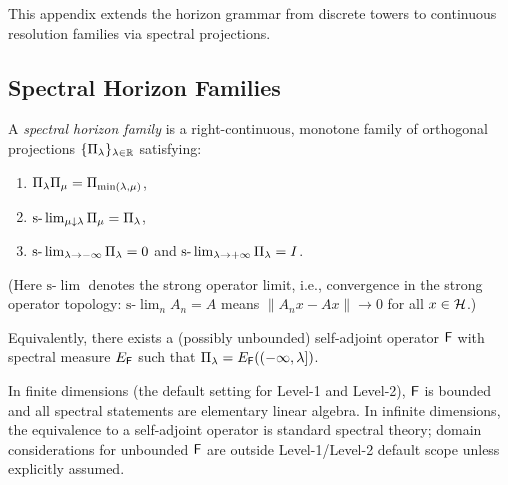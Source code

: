 \label{sec:continuous-spectral-horizons}

This appendix extends the horizon grammar from discrete towers to continuous
resolution families via spectral projections.

\subsection{Spectral Horizon Families}
\label{subsec:spectral-horizon-families}

\begin{definition}
\label{def:spectral-horizon-family}
A \emph{spectral horizon family} is a right-continuous, monotone family of orthogonal projections $\{\Pi_{\lambda}\}_{\lambda\in\mathbb{R}}$ satisfying:
\begin{enumerate}[label=(\roman*)]
\item $\Pi_{\lambda} \Pi_{\mu} = \Pi_{\min(\lambda,\mu)}$,
\item $\mathrm{s}\text{-}\lim_{\mu\downarrow\lambda}\Pi_{\mu}=\Pi_{\lambda}$,
\item $\mathrm{s}\text{-}\lim_{\lambda\to-\infty}\Pi_{\lambda}=0$ and $\mathrm{s}\text{-}\lim_{\lambda\to+\infty}\Pi_{\lambda}=I$.
\end{enumerate}
(Here $\mathrm{s}\text{-}\lim$ denotes the strong operator limit, i.e., convergence in the strong operator topology: $\mathrm{s}\text{-}\lim_n A_n = A$ means $\|A_n x - Ax\| \to 0$ for all $x \in \mathcal{H}$.)

\smallskip\noindent
Equivalently, there exists a (possibly unbounded) self-adjoint operator $\mathsf{F}$ with spectral measure $E_{\mathsf{F}}$ such that $\Pi_{\lambda} = E_{\mathsf{F}}((-\infty,\lambda])$.
\end{definition}

\begin{remark}
\label{rem:scope-unbounded-field}
In finite dimensions (the default setting for Level-1 and Level-2), $\mathsf{F}$ is bounded and all spectral statements are elementary linear algebra.
In infinite dimensions, the equivalence to a self-adjoint operator is standard spectral theory; domain considerations for unbounded $\mathsf{F}$ are outside Level-1/Level-2 default scope unless explicitly assumed.
\end{remark}

